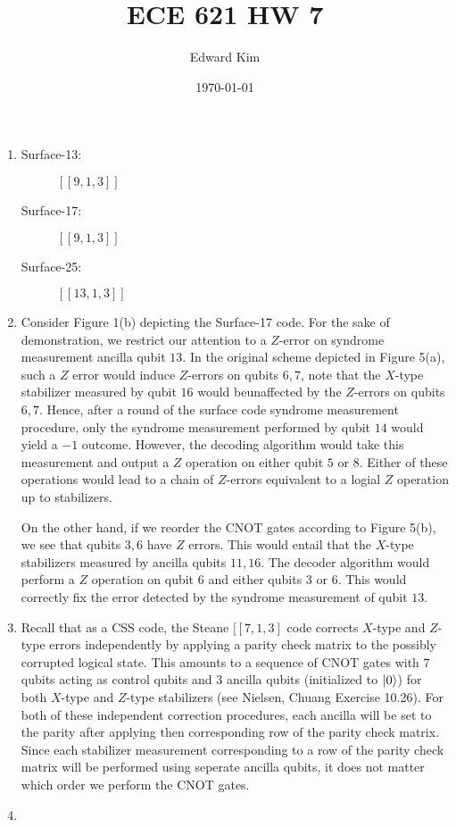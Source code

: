 \documentclass[12pt]{article}%
\begin{document}
\title{ECE 621 HW 7}
\author{Edward Kim}
\date{\today}
\maketitle

\begin{enumerate}
	\item 
		\begin{description}
			\item[Surface-13:] $[[9,1,3]]$
			\item[Surface-17:] $[[9,1,3]]$ 	
			\item[Surface-25:] $[[13,1,3]]$ 	
		\end{description}

	\item Consider Figure 1(b) depicting the Surface-17 code. For the sake of demonstration, we restrict our attention to a $Z$-error on syndrome measurement ancilla qubit $13$. In the original scheme depicted in Figure 5(a), such a $Z$ error would induce $Z$-errors on qubits $6, 7$, note that the $X$-type stabilizer measured by qubit $16$ would beunaffected by the $Z$-errors on qubits $6,7$. Hence, after a round of the surface code syndrome measurement procedure, only the syndrome measurement performed by qubit $14$ would yield a $-1$ outcome. However, the decoding algorithm would take this measurement and output a $Z$ operation on either qubit $5$ or $8$. Either of these operations would lead to a chain of $Z$-errors equivalent to a logial $Z$ operation up to stabilizers.

	On the other hand, if we reorder the CNOT gates according to Figure 5(b), we see that qubits $3,6$ have $Z$ errors. This would entail that the $X$-type stabilizers measured by ancilla qubits $11,16$. The decoder algorithm would perform a $Z$ operation on qubit $6$ and either qubits $3$ or $6$. This would correctly fix the error detected by the syndrome measurement of qubit $13$.

\item Recall that as a CSS code, the Steane $[[7,1,3]$ code corrects $X$-type and $Z$-type errors independently by applying a parity check matrix to the possibly corrupted logical state. This amounts to a sequence of CNOT gates with $7$ qubits acting as control qubits and $3$ ancilla qubits (initialized to $\ket{0}$) for both $X$-type and $Z$-type stabilizers (see Nielsen, Chuang Exercise 10.26). For both of these independent correction procedures, each ancilla will be set to the parity after applying then corresponding row of the parity check matrix.  Since each stabilizer measurement corresponding to a row of the parity check matrix will be performed using seperate ancilla qubits, it does not matter which order we perform the CNOT gates. 

\item 
	
\end{enumerate}
\end{document}
